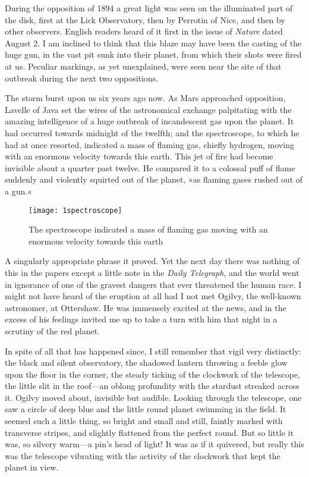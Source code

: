 During the opposition of 1894 a great light was seen on the illuminated part of the disk, first at the Lick Observatory, then by Perrotin of Nice, and then by other observers. English readers heard of it first in the issue of \textit{Nature} dated August 2. I am inclined to think that this blaze may have been the casting of the huge gun, in the vast pit sunk into their planet, from which their shots were fired at us. Peculiar markings, as yet unexplained, were seen near the site of that outbreak during the next two oppositions.

The storm burst upon us six years ago now. As Mars approached opposition, Lavelle of Java set the wires of the astronomical exchange palpitating with the amazing intelligence of a huge outbreak of incandescent gas upon the planet. It had occurred towards midnight of the twelfth; and the spectroscope, to which he had at once resorted, indicated a mass of flaming gas, chiefly hydrogen, moving with an enormous velocity towards this earth. This jet of fire had become invisible about a quarter past twelve. He compared it to a colossal puff of flame suddenly and violently squirted out of the planet, »as flaming gases rushed out of a gun.«

% 
 
\begin{figure}[tbhp]
\centering
\texttt{[image: 1spectroscope]}
\caption[The spectroscope indicated a mass of flaming gas]{The spectroscope indicated a mass of flaming gas moving with an enormous velocity towards this earth}
\end{figure}

A singularly appropriate phrase it proved. Yet the next day there was nothing of this in the papers except a little note in the \textit{Daily Telegraph}, and the world went in ignorance of one of the gravest dangers that ever threatened the human race. I might not have heard of the eruption at all had I not met Ogilvy, the well-known astronomer, at Ottershaw. He was immensely excited at the news, and in the excess of his feelings invited me up to take a turn with him that night in a scrutiny of the red planet.

In spite of all that has happened since, I still remember that vigil very distinctly: the black and silent observatory, the shadowed lantern throwing a feeble glow upon the floor in the corner, the steady ticking of the clockwork of the telescope, the little slit in the roof—an oblong profundity with the stardust streaked across it. Ogilvy moved about, invisible but audible. Looking through the telescope, one saw a circle of deep blue and the little round planet swimming in the field. It seemed such a little thing, so bright and small and still, faintly marked with transverse stripes, and slightly flattened from the perfect round. But so little it was, so silvery warm—a pin's head of light! It was as if it quivered, but really this was the telescope vibrating with the activity of the clockwork that kept the planet in view.

